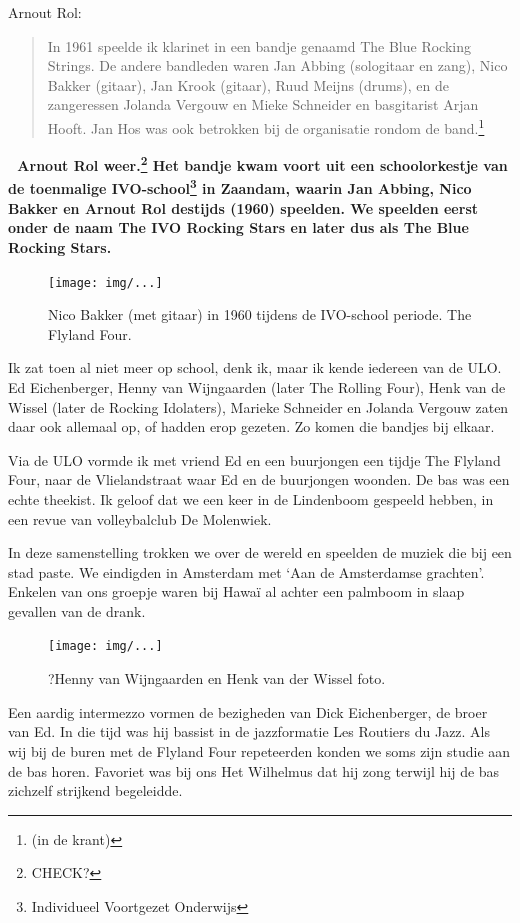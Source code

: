 \documentclass[12pt,twoside]{memoir}
\begin{document}
Arnout Rol:

\begin{quote}
In 1961 speelde ik klarinet in een bandje genaamd The Blue Rocking Strings. De andere bandleden waren Jan Abbing (sologitaar en zang), Nico Bakker (gitaar), Jan Krook (gitaar), Ruud Meijns (drums), en de zangeressen Jolanda Vergouw en Mieke Schneider en basgitarist Arjan Hooft. Jan Hos was ook betrokken bij de organisatie rondom de band.\footnote{(in de krant)}
\end{quote}
 
\bf{Arnout Rol weer.}\footnote{CHECK?} Het bandje kwam voort uit een schoolorkestje van de toenmalige IVO-school\footnote{Individueel Voortgezet Onderwijs} in Zaandam, waarin Jan Abbing, Nico Bakker en Arnout Rol destijds (1960) speelden. We speelden eerst onder de naam The IVO Rocking Stars en later dus als The Blue Rocking Stars. 

\begin{figure}[t]
\texttt{[image: img/...]}
\caption{Nico Bakker (met gitaar) in 1960 tijdens de IVO-school periode. The Flyland Four.}
\end{figure}	

Ik zat toen al niet meer op school, denk ik, maar ik kende iedereen van de ULO. Ed Eichenberger, Henny van Wijngaarden (later The Rolling Four), Henk van de Wissel (later de Rocking Idolaters), Marieke Schneider en Jolanda Vergouw zaten daar ook allemaal op, of hadden erop gezeten. Zo komen die bandjes bij elkaar.

Via de ULO vormde ik met vriend Ed en een buurjongen een tijdje The Flyland Four, naar de Vlielandstraat waar Ed en de buurjongen woonden. De bas was een echte theekist. Ik geloof dat we een keer in de Lindenboom gespeeld hebben, in een revue van volleybalclub De Molenwiek. 

In deze samenstelling trokken we over de wereld en speelden de muziek die bij een stad paste. We eindigden in Amsterdam met `Aan de Amsterdamse grachten'. Enkelen van ons groepje waren bij Hawaï al achter een palmboom in slaap gevallen van de drank. 

\begin{figure}[t]
\texttt{[image: img/...]}
\caption{?Henny van Wijngaarden en Henk van der Wissel foto.}
\end{figure}  

Een aardig intermezzo vormen de bezigheden van Dick Eichenberger, de broer van Ed. In die tijd was hij bassist in de jazzformatie Les Routiers du Jazz. Als wij bij de buren met de Flyland Four repeteerden konden we soms zijn studie aan de bas horen. Favoriet was bij ons Het Wilhelmus dat hij zong terwijl hij de bas zichzelf strijkend begeleidde. 
\end{document}
